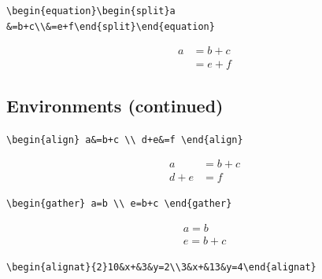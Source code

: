 \documentclass[9pt]{extarticle}
\begin{document}

{\small\verb|\begin{equation}\begin{split}a| \\ \verb|&=b+c\\&=e+f\end{split}\end{equation}|}

\begin{equation}\begin{split}a &=b+c\\&=e+f\end{split}\end{equation}

\newpage
\subsection*{Environments (continued)}

{\small\verb|\begin{align} a&=b+c \\ d+e&=f \end{align}|}

\begin{align} a&=b+c \\ d+e&=f \end{align}

{\small\verb|\begin{gather} a=b \\ e=b+c \end{gather}|}

\begin{gather} a=b \\ e=b+c \end{gather}

{\small\verb|\begin{alignat}{2}10&x+&3&y=2\\3&x+&13&y=4\end{alignat}|}
\end{document}
